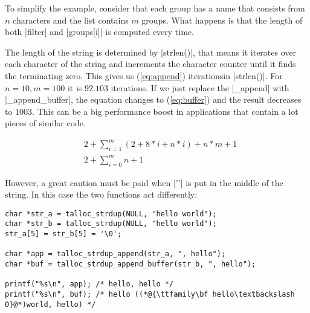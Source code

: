 \noindent
To simplify the example, consider that each group has a name that consists
from $n$ characters and the list contains $m$ groups. What happens is that
the length of both |filter| and |groups[i]| is computed every time.

The length of the string is determined by |strlen()|, that means it iterates
over each character of the string and increments the character counter until it
finds the terminating zero. This gives us (\ref{eq:append})
iterations\footnotemark in |strlen()|. For $n = 10, m = 100$ it is $92.103$
iterations. If we just replace the |_append| with |_append_buffer|, the
equation changes to (\ref{eq:buffer}) and the result decreases to $1003$. This
can be a big performance boost in applications that contain a lot pieces of
similar code.


\begin{align}
&2 + \sum_{i=1}^m (2 + 8*i + n*i) + n*m + 1 \label{eq:append} \\
&2 + \sum_{i=0}^m n + 1 \label{eq:buffer}
\end{align}

\noindent
However, a great caution must be paid when |'\0'| is put in the middle of the
string. In this case the two functions act differently:

\begin{lstlisting}[caption={Zero in the middle of a string}]
char *str_a = talloc_strdup(NULL, "hello world");
char *str_b = talloc_strdup(NULL, "hello world");
str_a[5] = str_b[5] = '\0';

char *app = talloc_strdup_append(str_a, ", hello");
char *buf = talloc_strdup_append_buffer(str_b, ", hello");

printf("%s\n", app); /* hello, hello */
printf("%s\n", buf); /* hello ((*@{\ttfamily\bf hello\textbackslash 0}@*)world, hello) */
\end{lstlisting}
